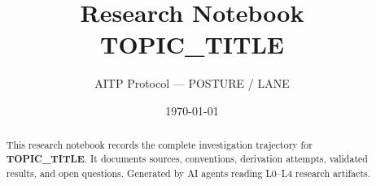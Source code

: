 \documentclass[a4paper,11pt]{article}
\title{\textbf{Research Notebook}\\[0.3em]
       \large {{TOPIC_TITLE}}}
\author{AITP Protocol — {{POSTURE}} / {{LANE}}}
\date{\today}
\begin{document}
\maketitle

\begin{abstract}
This research notebook records the complete investigation trajectory for
\textbf{{{TOPIC_TITLE}}}. It documents sources, conventions, derivation
attempts, validated results, and open questions. Generated by AI agents
reading L0--L4 research artifacts.
\end{abstract}

\tableofcontents
\newpage













\end{document}
